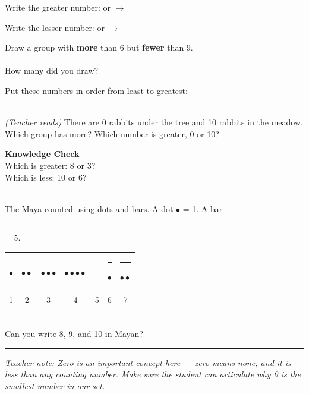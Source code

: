 \documentclass[12pt,letterpaper]{article}
\begin{document}
\vspace{10pt}
\prob Write the greater number:  \quad or  \quad $\longrightarrow$ \quad\ansblank

\vspace{10pt}
\prob Write the lesser number:  \quad or  \quad $\longrightarrow$ \quad\ansblank

\vspace{10pt}
\prob Draw a group with \textbf{more} than 6 but \textbf{fewer} than 9.\\[4pt]
\noindent\fbox{\rule{0pt}{2.2cm}\hspace{11cm}}\\[4pt]
How many did you draw? \quad\ansblank

\vspace{10pt}
\prob Put these numbers in order from least to greatest:\\[6pt]
\hspace{2cm}{\Large 10 \quad 3 \quad 7 \quad 1 \quad 5}\\[6pt]
\hspace{2cm}\ansblank\quad\ansblank\quad\ansblank\quad\ansblank\quad\ansblank

\vspace{10pt}
\prob \textit{(Teacher reads)} There are 0 rabbits under the tree and
10 rabbits in the meadow.
Which group has more? \quad\ansblank \quad
Which number is greater, 0 or 10? \quad\ansblank

\goldrule

\begin{checkbox}
\noindent\textbf{\color{sd-green}Knowledge Check}\\[4pt]
\setcounter{probnum}{0}
\prob Which is greater: 8 or 3? \quad\ansblank\\[8pt]
\prob Which is less: 10 or 6? \quad\ansblank
\end{checkbox}

\vfill
{}\\
The Maya counted using dots and bars.
A dot $\bullet$ = 1. A bar \rule{0.8cm}{2pt} = 5.\\[4pt]
\begin{tabular}{ccccccc}
$\bullet$ & $\bullet\bullet$ & $\bullet\bullet\bullet$ &
$\bullet\bullet\bullet\bullet$ & \rule{0.8cm}{2pt} &
\rule{0.8cm}{2pt}$\bullet$ & \rule{0.8cm}{2pt}$\bullet\bullet$\\
1 & 2 & 3 & 4 & 5 & 6 & 7
\end{tabular}\\[4pt]
Can you write 8, 9, and 10 in Mayan?

\vspace{4pt}\hrule\vspace{3pt}
{\footnotesize\color{gray}\textit{Teacher note: Zero is an important concept here — zero means none, and it is less than any counting number. Make sure the student can articulate why 0 is the smallest number in our set.}}
\end{document}
